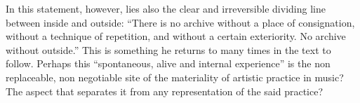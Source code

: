 In this statement, however, lies also the clear and irreversible dividing line between inside and outside: ``There is no archive without a place of consignation, without a technique of repetition, and without a certain exteriority. No archive without outside.'' \citep[p. 11]{derrida1998} This is something he returns to many times in the text to follow. Perhaps this ``spontaneous, alive and internal experience'' is the non replaceable, non negotiable site of the materiality of artistic practice in music? The aspect that separates it from any representation of the said practice?
